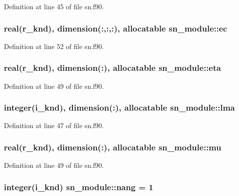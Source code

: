 Definition at line 45 of file sn.\-f90.

\hypertarget{classsn__module_a6c731da2dcf64d3f53314281c79e26a0}{
\subsubsection[{ec}]{\setlength{\rightskip}{0pt plus 5cm}real(r\-\_\-knd), dimension(\-:,\-:,\-:), allocatable sn\-\_\-module\-::ec}}\label{classsn__module_a6c731da2dcf64d3f53314281c79e26a0}


Definition at line 52 of file sn.\-f90.

\hypertarget{classsn__module_a56d70ad9f47dfacf81cec43705659ad5}{
\subsubsection[{eta}]{\setlength{\rightskip}{0pt plus 5cm}real(r\-\_\-knd), dimension(\-:), allocatable sn\-\_\-module\-::eta}}\label{classsn__module_a56d70ad9f47dfacf81cec43705659ad5}


Definition at line 49 of file sn.\-f90.

\hypertarget{classsn__module_a4ea10df8637124ad5ba5fedcad899761}{
\subsubsection[{lma}]{\setlength{\rightskip}{0pt plus 5cm}integer(i\-\_\-knd), dimension(\-:), allocatable sn\-\_\-module\-::lma}}\label{classsn__module_a4ea10df8637124ad5ba5fedcad899761}


Definition at line 47 of file sn.\-f90.

\hypertarget{classsn__module_ac93ecb91c234e5c544ad83bfda53f57b}{
\subsubsection[{mu}]{\setlength{\rightskip}{0pt plus 5cm}real(r\-\_\-knd), dimension(\-:), allocatable sn\-\_\-module\-::mu}}\label{classsn__module_ac93ecb91c234e5c544ad83bfda53f57b}


Definition at line 49 of file sn.\-f90.

\hypertarget{classsn__module_acb1f3dc6837597cfce3b070824a30549}{
\subsubsection[{nang}]{\setlength{\rightskip}{0pt plus 5cm}integer(i\-\_\-knd) sn\-\_\-module\-::nang = 1}}\label{classsn__module_acb1f3dc6837597cfce3b070824a30549}


